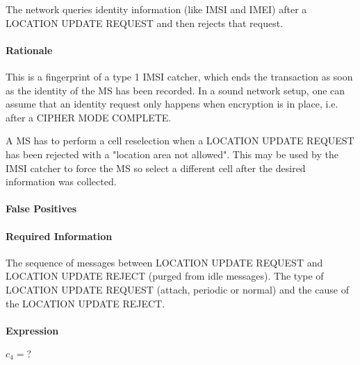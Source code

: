 \documentclass[a4paper,11pt,notitlepage,bigheadings,oneside]{scrartcl}
\begin{document}
The network queries identity information (like IMSI and IMEI) after a LOCATION
UPDATE REQUEST and then rejects that request.

\paragraph{Rationale}

This is a fingerprint of a type 1 IMSI catcher, which ends the transaction as
soon as the identity of the MS has been recorded. In a sound network setup, one
can assume that an identity request only happens when encryption is in place,
i.e. after a CIPHER MODE COMPLETE.

A MS has to perform a cell reselection when a LOCATION UPDATE REQUEST has been
rejected with a "location area not allowed". This may be used by the IMSI
catcher to force the MS so select a different cell after the desired
information was collected.


\paragraph{False Positives}


\paragraph{Required Information}

The sequence of messages between LOCATION UPDATE REQUEST and LOCATION UPDATE
REJECT (purged from idle messages). The type of LOCATION UPDATE REQUEST
(attach, periodic or normal) and the cause of the LOCATION UPDATE REJECT.

\paragraph{Expression}

$c_4 = ?$

\end{document}

